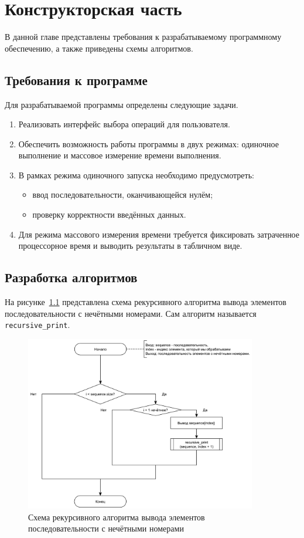 \chapter{Конструкторская часть}

В данной главе представлены требования к разрабатываемому программному обеспечению, а также приведены схемы алгоритмов.

\section{Требования к программе}

Для разрабатываемой программы определены следующие задачи.
\begin{enumerate}
	\item Реализовать интерфейс выбора операций для пользователя.
	\item Обеспечить возможность работы программы в двух режимах: одиночное выполнение и массовое измерение времени выполнения.
	\item В рамках режима одиночного запуска необходимо предусмотреть:
	\begin{itemize}
		\item ввод последовательности, оканчивающейся нулём;
		\item проверку корректности введённых данных.
	\end{itemize}
	\item Для режима массового измерения времени требуется фиксировать затраченное процессорное время и выводить результаты в табличном виде.
\end{enumerate}

\section{Разработка алгоритмов}

На рисунке~\ref{recursive} представлена схема рекурсивного алгоритма вывода элементов последовательности с нечётными номерами. Сам алгоритм называется \texttt{recursive\_print}.

\begin{figure}[h!]
	\centering
	\includegraphics[width=0.9\textwidth, height=0.9\textheight, keepaspectratio]{images/recursive_scheme}
	\caption{Схема рекурсивного алгоритма вывода элементов последовательности с нечётными номерами}
	\label{recursive}
\end{figure}
\clearpage

